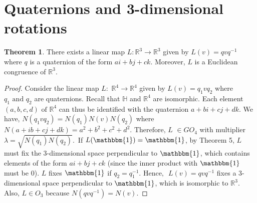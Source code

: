 \documentclass[11pt]{report}
\theoremstyle{plain}
\theoremstyle{definition}
\newtheorem{theorem}{Theorem}
\begin{document}
\section{Quaternions and 3-dimensional rotations}
\begin{theorem}
	There exists a linear map $ L : \mathbb{R}^3 \to \mathbb{R}^3 $ given by $ L(v)=qvq^{-1} $ where $ q $ is a quaternion of the form $ ai+bj+ck. $ Moreover, $ L $ is a Euclidean congruence of $ \mathbb{R}^3 $.	
\end{theorem}
\begin{proof}
	Consider the linear map $ L: $   $\mathbb{R}^4  \to  \mathbb{R}^4$ given by $ L(v)=q_1 v q_2 $ where $ q_1 \text{ and } q_2 $ are quaternions. Recall that $ \mathbb{H}  $ and $ \mathbb{R}^4 $ are isomorphic. Each element $ (a,b,c,d) \text{ of } \mathbb{R}^4 $ can thus be identified with the quaternion $  a+bi+cj+dk. $  We have, $ N(q_1vq_2) = N(q_1)N(v)N(q_2) $ where $ N(a+ib+cj+dk)=a^2+b^2+c^2+d^2 $.  $ \text{Therefore, }L $ $ \in GO_4$ with multiplier $\lambda =  \sqrt{N(q_1)N(q_2)}. $\ If $ L(\mathbbm{1})=\mathbbm{1} $, by Theorem 5, $ L $ must fix the 3-dimensional space perpendicular to $ \mathbbm{1} $, which contains elements of the form $ ai + bj + ck $ (since the inner product with $ \mathbbm{1} $ must be 0). $ L $ fixes $ \mathbbm{1} $ if $ q_2 = q_1^{-1} $. $ \text{Hence, }$ $ L(v)=qvq^{-1}$ fixes a 3-dimensional space perpendicular to $ \mathbbm{1} $, which is isomorphic to $\mathbb{R}^3.$ Also, $ L \in O_3 $ because $ N(qvq^{-1})=N(v). $ 
\end{proof}
\end{document}
